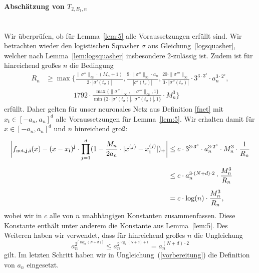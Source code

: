 \paragraph*{Abschätzung von $T_{2,B_1,n}$}\mbox{}\\
Wir überprüfen, ob für Lemma~\ref{lem:5} alle Voraussetzungen erfüllt sind. Wir betrachten wieder den logistischen Squasher $\sigma$ aus Gleichung~\ref{logsquasher}, welcher nach Lemma~\ref{lem:logsquasher} insbesondere 2-zulässig ist. Zudem ist für hinreichend großes $n$ die Bedingung 
\begin{equation*}
\begin{split}
R_n & \geq \max\biggl\{\frac{\|\sigma''\|_{\infty} \cdot (M_n + 1)}{2 \cdot |\sigma'(t_{\sigma})|}, \frac{9 \cdot \|\sigma''\|_{\infty} \cdot a_n}{|\sigma'(t_{\sigma})|}, \frac{20 \cdot \|\sigma'''\|_{\infty}}{3 \cdot |\sigma''(t_{\sigma})|} \cdot 3^{3 \cdot 3^s} \cdot a_n^{3 \cdot 2^s}, \\[0.5em]
& \qquad \qquad 1792 \cdot \frac{\max\{\|\sigma''\|_{\infty},\|\sigma'''\|_{\infty}, 1\}}{\min\{2 \cdot |\sigma'(t_{\sigma})|, |\sigma''(t_{\sigma})|, 1\}} \cdot M_n^3 \biggr\}
\end{split}
\end{equation*}
erfüllt. Daher gelten für unser neuronales Netz aus Definition \ref{fnet} mit $x_{\mathbf{i}} \in [-a_n, a_n]^d$ alle Voraussetzungen für Lemma~\ref{lem:5}.
Wir erhalten damit für $x \in [-a_n ,a_n]^d$ und $n$ hinreichend groß:
\begin{equation}
\label{vorbereitung}
\begin{split}
\bigg| f_{\mathrm{net},\mathbf{j},\mathbf{i}}(x) - (x - x_{\mathbf{i}})^{\mathbf{j}} \cdot \prod_{j = 1}^d(1 - \frac{M_n}{2a_n} \cdot |x^{(j)} - x_{\mathbf{i}}^{(j)}|)_+ \bigg| & \leq c \cdot 3^{3 \cdot 3^s} \cdot a_n^{3 \cdot 2^s} \cdot M_n^3 \cdot \frac{1}{R_n} \\[0.5em]
& \leq c\cdot a_n^{3 \cdot (N + d) \cdot 2} \cdot \frac{M_n^3}{R_n} \\[0.5em]
& = c\cdot \log(n) \cdot \frac{M_n^3}{R_n},  
\end{split}
\end{equation}
wobei wir in $c$ alle von $n$ unabhängigen Konstanten zusammenfassen. Diese Konstante enthält unter anderem die Konstante aus Lemma~\ref{lem:5}.
Des Weiteren haben wir verwendet, dass für hinreichend großes $n$ die Ungleichung
$$a_n^{2^{\lceil\log_2(N + d)\rceil}} \leq a_n^{2^{\log_2(N + d) + 1}} = a_n^{(N + d) \cdot 2}$$ gilt. Im letzten Schritt haben wir in Ungleichung~(\ref{vorbereitung}) die Definition von $a_n$ eingesetzt. 
